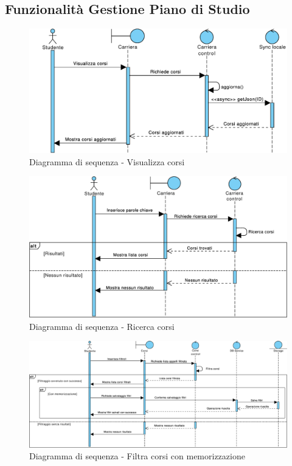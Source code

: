 \subsection{Funzionalità Gestione Piano di Studio}

\begin{figure}[h]
	\centering
	\includegraphics[width=6.5in]{imgs/gruppo1/sequence_diagrams/SD1_visualizza_corsi.pdf}
	\caption{Diagramma di sequenza - Visualizza corsi}
	\label{diag:visualizzaCorsiSD}
\end{figure}

\begin{figure}
	\centering
	\includegraphics[width=6.5in]{imgs/gruppo1/sequence_diagrams/SD2_ricerca_corsi.pdf}
	\caption{Diagramma di sequenza - Ricerca corsi}
	\label{diag:ricercaCorsiSD}
\end{figure}
\newpage

\begin{figure}
	\centering
	\includegraphics[width=6.5in]{imgs/gruppo1/sequence_diagrams/SD3_filtra_corsi_con_memorizzazione.pdf}
	\caption{Diagramma di sequenza - Filtra corsi con memorizzazione}
	\label{diag:filtraCorsiConMemSD}
\end{figure}

